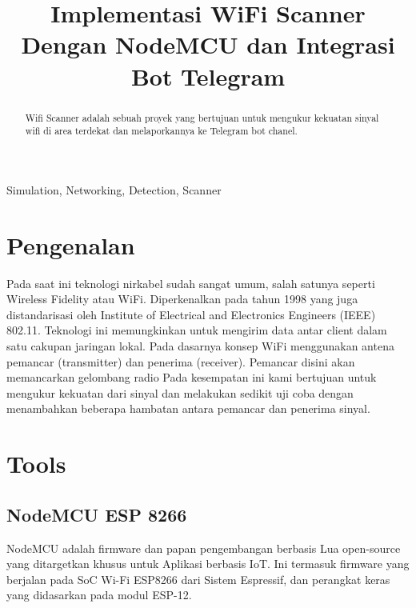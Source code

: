 \documentclass[conference]{IEEEtran}
\begin{document}
\title{Implementasi WiFi Scanner Dengan NodeMCU dan Integrasi Bot Telegram}

\author{
	\and
}
\maketitle

\begin{abstract}
	Wifi Scanner adalah sebuah proyek yang bertujuan untuk mengukur kekuatan sinyal wifi di area terdekat dan melaporkannya ke Telegram bot chanel.
\end{abstract}

\begin{IEEEkeywords}
	Simulation, Networking, Detection, Scanner
\end{IEEEkeywords}

\section{Pengenalan}
Pada saat ini teknologi nirkabel sudah sangat umum, salah satunya seperti Wireless Fidelity atau WiFi. Diperkenalkan pada tahun 1998 yang juga distandarisasi oleh Institute of Electrical and Electronics Engineers (IEEE) 802.11. Teknologi ini memungkinkan untuk mengirim data antar client dalam satu cakupan jaringan lokal. Pada dasarnya konsep WiFi menggunakan antena pemancar (transmitter) dan penerima (receiver). Pemancar disini akan memancarkan gelombang radio Pada kesempatan ini kami bertujuan untuk mengukur kekuatan dari sinyal dan melakukan sedikit uji coba dengan menambahkan beberapa hambatan antara pemancar dan penerima sinyal.

\section{Tools}\label{teori-tool}

\subsection{NodeMCU ESP 8266}
NodeMCU adalah firmware dan papan pengembangan berbasis Lua open-source yang ditargetkan khusus untuk Aplikasi berbasis IoT. Ini termasuk firmware yang berjalan pada SoC Wi-Fi ESP8266 dari Sistem Espressif, dan perangkat keras yang didasarkan pada modul ESP-12.
\end{document}
